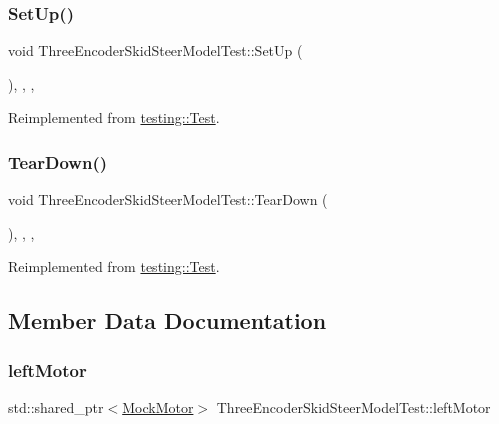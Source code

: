 \subsubsection{\texorpdfstring{SetUp()}{SetUp()}}
{\footnotesize\ttfamily void Three\+Encoder\+Skid\+Steer\+Model\+Test\+::\+Set\+Up (\begin{DoxyParamCaption}{ }\end{DoxyParamCaption})\hspace{0.3cm}{\ttfamily [inline]}, {\ttfamily [override]}, {\ttfamily [protected]}, {\ttfamily [virtual]}}



Reimplemented from \mbox{\hyperlink{classtesting_1_1Test_a190315150c303ddf801313fd1a777733}{testing\+::\+Test}}.

\mbox{\label{classThreeEncoderSkidSteerModelTest_ac26aaffa411b90fde9ff31c77cba5bfd}} 
\subsubsection{\texorpdfstring{TearDown()}{TearDown()}}
{\footnotesize\ttfamily void Three\+Encoder\+Skid\+Steer\+Model\+Test\+::\+Tear\+Down (\begin{DoxyParamCaption}{ }\end{DoxyParamCaption})\hspace{0.3cm}{\ttfamily [inline]}, {\ttfamily [override]}, {\ttfamily [protected]}, {\ttfamily [virtual]}}



Reimplemented from \mbox{\hyperlink{classtesting_1_1Test_a5f0ab439802cbe0ef7552f1a9f791923}{testing\+::\+Test}}.



\subsection{Member Data Documentation}
\mbox{\label{classThreeEncoderSkidSteerModelTest_a2ae0bf5282ae4426b9ec8c82fed14aaf}} 
\subsubsection{\texorpdfstring{leftMotor}{leftMotor}}
{\footnotesize\ttfamily std\+::shared\+\_\+ptr$<$\mbox{\hyperlink{classokapi_1_1MockMotor}{Mock\+Motor}}$>$ Three\+Encoder\+Skid\+Steer\+Model\+Test\+::left\+Motor\hspace{0.3cm}{\ttfamily [protected]}}

